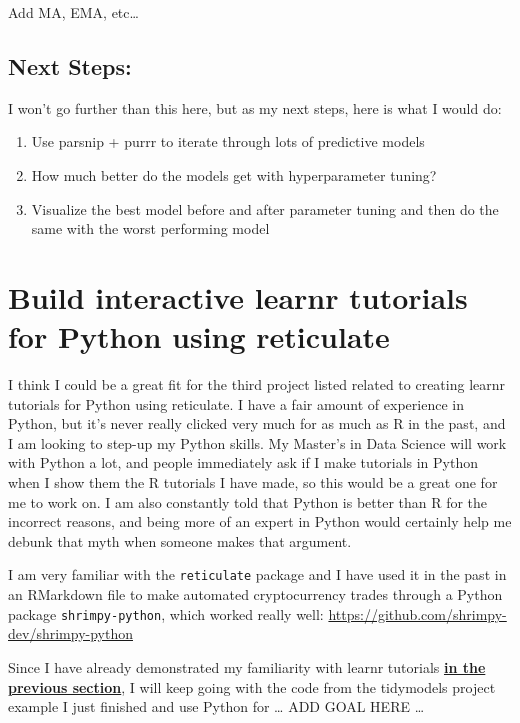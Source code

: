 \documentclass[
]{book}
\begin{document}
Add MA, EMA, etc\ldots{}

\hypertarget{next-steps}{%
\subsection{Next Steps:}\label{next-steps}}

I won't go further than this here, but as my next steps, here is what I would do:

\begin{enumerate}
\def\labelenumi{\arabic{enumi}.}
\item
  Use parsnip + purrr to iterate through lots of predictive models
\item
  How much better do the models get with hyperparameter tuning?
\item
  Visualize the best model before and after parameter tuning and then do the same with the worst performing model
\end{enumerate}

\hypertarget{build-interactive-learnr-tutorials-for-python-using-reticulate}{%
\section{Build interactive learnr tutorials for Python using reticulate}\label{build-interactive-learnr-tutorials-for-python-using-reticulate}}

I think I could be a great fit for the third project listed related to creating learnr tutorials for Python using reticulate. I have a fair amount of experience in Python, but it's never really clicked very much for as much as R in the past, and I am looking to step-up my Python skills. My Master's in Data Science will work with Python a lot, and people immediately ask if I make tutorials in Python when I show them the R tutorials I have made, so this would be a great one for me to work on. I am also constantly told that Python is better than R for the incorrect reasons, and being more of an expert in Python would certainly help me debunk that myth when someone makes that argument.

I am very familiar with the \texttt{reticulate} package and I have used it in the past in an RMarkdown file to make automated cryptocurrency trades through a Python package \texttt{shrimpy-python}, which worked really well: \url{https://github.com/shrimpy-dev/shrimpy-python}

Since I have already demonstrated my familiarity with learnr tutorials \textbf{\protect\hyperlink{learnr}{in the previous section}}, I will keep going with the code from the tidymodels project example I just finished and use Python for \ldots{} ADD GOAL HERE \ldots{}
\end{document}
